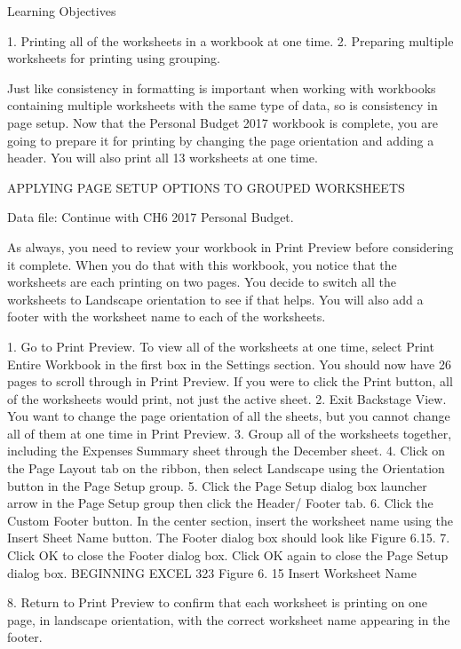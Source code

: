 Learning Objectives


1. Printing all of the worksheets in a workbook at one time.
2. Preparing multiple worksheets for printing using grouping.



Just like consistency in formatting is important when working with workbooks containing multiple
worksheets with the same type of data, so is consistency in page setup. Now that the Personal Budget
2017 workbook is complete, you are going to prepare it for printing by changing the page orientation
and adding a header. You will also print all 13 worksheets at one time.

APPLYING PAGE SETUP OPTIONS TO GROUPED WORKSHEETS

Data file: Continue with CH6 2017 Personal Budget.

As always, you need to review your workbook in Print Preview before considering it complete. When
you do that with this workbook, you notice that the worksheets are each printing on two pages. You
decide to switch all the worksheets to Landscape orientation to see if that helps. You will also add a
footer with the worksheet name to each of the worksheets.

1. Go to Print Preview. To view all of the worksheets at one time, select Print Entire Workbook in
the first box in the Settings section. You should now have 26 pages to scroll through in Print
Preview. If you were to click the Print button, all of the worksheets would print, not just the
active sheet.
2. Exit Backstage View. You want to change the page orientation of all the sheets, but you cannot
change all of them at one time in Print Preview.
3. Group all of the worksheets together, including the Expenses Summary sheet through the
December sheet.
4. Click on the Page Layout tab on the ribbon, then select Landscape using the Orientation button
in the Page Setup group.
5. Click the Page Setup dialog box launcher arrow in the Page Setup group then click the Header/
Footer tab.
6. Click the Custom Footer button. In the center section, insert the worksheet name using the
Insert Sheet Name button. The Footer dialog box should look like Figure 6.15.
7. Click OK to close the Footer dialog box. Click OK again to close the Page Setup dialog box.
BEGINNING EXCEL 323
Figure 6. 15 Insert Worksheet Name


8. Return to Print Preview to confirm that each worksheet is printing on one page, in landscape
orientation, with the correct worksheet name appearing in the footer.

